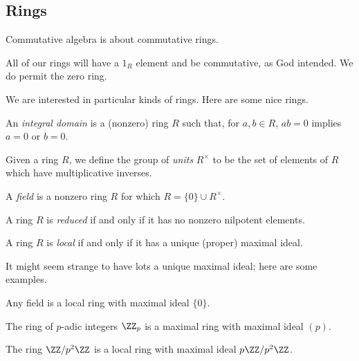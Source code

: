 \subsection{Rings}
Commutative algebra is about commutative rings.
\begin{convention}
	All of our rings will have a $1_R$ element and be commutative, as God intended. We do permit the zero ring.
\end{convention}
We are interested in particular kinds of rings. Here are some nice rings.
\begin{definition}
	An \textit{integral domain} is a (nonzero) ring $R$ such that, for $a,b\in R$, $ab=0$ implies $a=0$ or $b=0$.
\end{definition}
\begin{definition}[Units]
	Given a ring $R$, we define the group of \textit{units} $R^\times$ to be the set of elements of $R$ which have multiplicative inverses.
\end{definition}
\begin{definition}[Field]
	A \textit{field} is a nonzero ring $R$ for which $R=\{0\}\cup R^\times$.
\end{definition}
\begin{definition}[Reduced]
	A ring $R$ is \textit{reduced} if and only if it has no nonzero nilpotent elements.
\end{definition}
\begin{definition}[Local]
	A ring $R$ is \textit{local} if and only if it has a unique (proper) maximal ideal.
\end{definition}
It might seem strange to have lots a unique maximal ideal; here are some examples.
\begin{example}
	Any field is a local ring with maximal ideal $\{0\}$.
\end{example}
\begin{example}
	The ring of $p$-adic integers $\ZZ_p$ is a maximal ring with maximal ideal $(p)$.
\end{example}
\begin{example}
	The ring $\ZZ/p^2\ZZ$ is a local ring with maximal ideal $p\ZZ/p^2\ZZ$.
\end{example}

